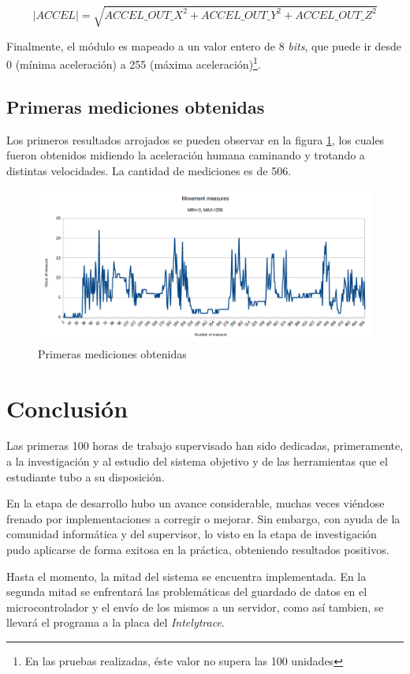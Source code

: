 \documentclass{article}
\newcommand{ \fnmodulo }{\footnote{En las pruebas realizadas, éste valor no supera las 100 unidades}}
\begin{document}
    \[ |ACCEL| = \sqrt{ ACCEL\_OUT\_X^2 + ACCEL\_OUT\_Y^2 + ACCEL\_OUT\_Z^2 } \]

    Finalmente, el módulo es mapeado a un valor entero de 8 \emph{bits}, que 
    puede ir desde 0 (mínima aceleración) a 255 (máxima aceleración)\fnmodulo.
    
    \subsection{Primeras mediciones obtenidas}
    Los primeros resultados arrojados se pueden observar en la figura 
    \ref{fig:resultados_devkit}, los cuales fueron obtenidos midiendo la 
    aceleración humana caminando y trotando a distintas velocidades. La 
    cantidad de mediciones es de 506.

    \begin{figure}[H]
        \includegraphics[width=1.0 \textwidth, center]{results_devkit.png}
        \caption{Primeras mediciones obtenidas}
        \label{fig:resultados_devkit}
    \end{figure}


    \newpage
    \section{Conclusión}

    Las primeras 100 horas de trabajo supervisado han sido dedicadas,
    primeramente, a la investigación y al estudio del sistema objetivo y de las
    herramientas que el estudiante tubo a su disposición. \par
    En la etapa de desarrollo hubo un avance considerable, muchas veces viéndose
    frenado por implementaciones a corregir o mejorar. Sin embargo, con ayuda
    de la comunidad informática y del supervisor, lo visto en la etapa de 
    investigación pudo aplicarse de forma exitosa en la práctica, obteniendo
    resultados positivos. \par
    Hasta el momento, la mitad del sistema se encuentra implementada. En la 
    segunda mitad se enfrentará las problemáticas del guardado de datos en el
    microcontrolador y el envío de los mismos a un servidor, como así tambien,
    se llevará el programa a la placa del \emph{Intelytrace}.

\end{document}
